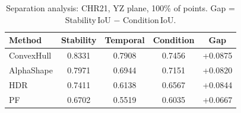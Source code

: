 \begin{table}[ht]
\centering
\small
\caption{Separation analysis: CHR21, YZ plane, 100\% of points. Gap = Stability\,IoU $-$ Condition\,IoU.}
\label{tab:sep_chr21}
\begin{tabular}{lcccc}
\toprule
Method & Stability & Temporal & Condition & Gap \\
\midrule
ConvexHull & 0.8331 & 0.7908 & 0.7456 & +0.0875 \\
AlphaShape & 0.7971 & 0.6944 & 0.7151 & +0.0820 \\
HDR & 0.7411 & 0.6138 & 0.6567 & +0.0844 \\
PF & 0.6702 & 0.5519 & 0.6035 & +0.0667 \\
\bottomrule
\end{tabular}
\end{table}